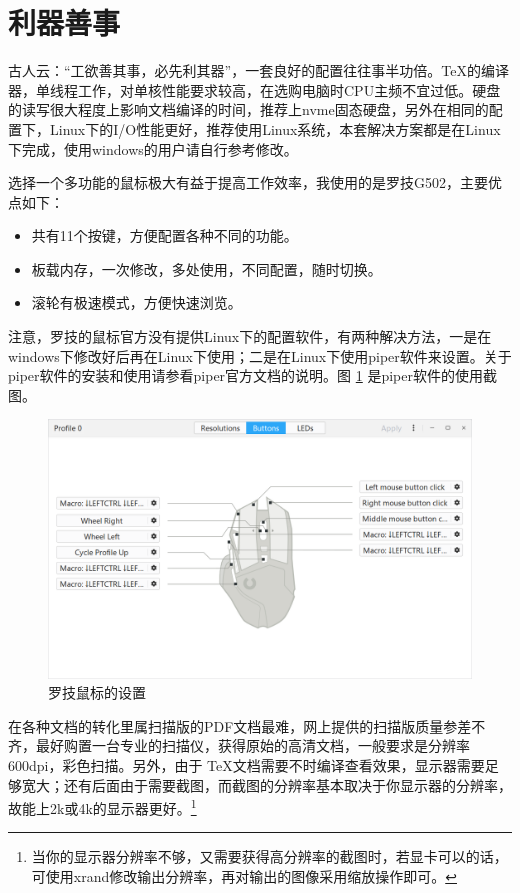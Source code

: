 \section{利器善事}
古人云：“工欲善其事，必先利其器”，一套良好的配置往往事半功倍。\TeX 的编译器，单线程工作，对单核性能要求较高，在选购电脑时CPU主频不宜过低。硬盘的读写很大程度上影响文档编译的时间，推荐上nvme固态硬盘，另外在相同的配置下，Linux下的I/O性能更好，推荐使用Linux系统，本套解决方案都是在Linux下完成，使用windows的用户请自行参考修改。

选择一个多功能的鼠标极大有益于提高工作效率，我使用的是罗技G502，主要优点如下：
\begin{itemize}
	\item 
	共有11个按键，方便配置各种不同的功能。
	\item 
	板载内存，一次修改，多处使用，不同配置，随时切换。
	\item 
	滚轮有极速模式，方便快速浏览。
\end{itemize}
注意，罗技的鼠标官方没有提供Linux下的配置软件，有两种解决方法，一是在windows下修改好后再在Linux下使用；二是在Linux下使用piper软件来设置。关于piper软件的安装和使用请参看piper官方文档的说明。图 \ref{fig:screenshot001} 是piper软件的使用截图。
\begin{figure}[h!]
	\centering
	\includegraphics[width=0.7\linewidth]{picture/screenshot001}
	\caption{罗技鼠标的设置}
	\label{fig:screenshot001}
\end{figure}

在各种文档的转化里属扫描版的PDF文档最难，网上提供的扫描版质量参差不齐，最好购置一台专业的扫描仪，获得原始的高清文档，一般要求是分辨率600dpi，彩色扫描。另外，由于 \TeX 文档需要不时编译查看效果，显示器需要足够宽大；还有后面由于需要截图，而截图的分辨率基本取决于你显示器的分辨率，故能上2k或4k的显示器更好。\footnote{当你的显示器分辨率不够，又需要获得高分辨率的截图时，若显卡可以的话，可使用xrand修改输出分辨率，再对输出的图像采用缩放操作即可。}

